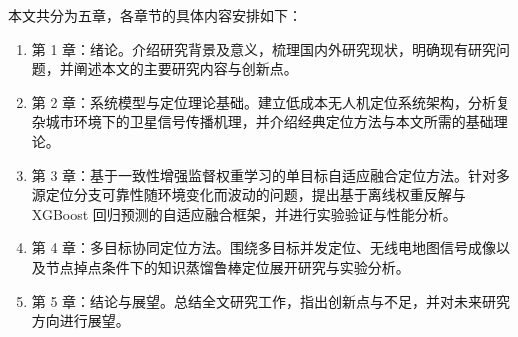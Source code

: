 本文共分为五章，各章节的具体内容安排如下：
\begin{enumerate}[label=,leftmargin=0pt,itemindent=2em]
    \item 第 1 章：绪论。介绍研究背景及意义，梳理国内外研究现状，明确现有研究问题，并阐述本文的主要研究内容与创新点。
    \item 第 2 章：系统模型与定位理论基础。建立低成本无人机定位系统架构，分析复杂城市环境下的卫星信号传播机理，并介绍经典定位方法与本文所需的基础理论。
    \item 第 3 章：基于一致性增强监督权重学习的单目标自适应融合定位方法。针对多源定位分支可靠性随环境变化而波动的问题，提出基于离线权重反解与 XGBoost 回归预测的自适应融合框架，并进行实验验证与性能分析。
    \item 第 4 章：多目标协同定位方法。围绕多目标并发定位、无线电地图信号成像以及节点掉点条件下的知识蒸馏鲁棒定位展开研究与实验分析。
    \item 第 5 章：结论与展望。总结全文研究工作，指出创新点与不足，并对未来研究方向进行展望。
\end{enumerate}
